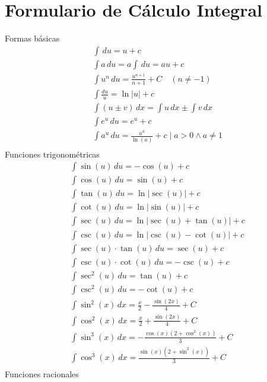 \section{Formulario de Cálculo Integral}
Formas básicas
\begin{align}
    &\int\,du = u + c\\
    &\int a\,du = a\int\,du = au + c\\
    &\int u^n \, du = \frac{u^{n+1}}{n+1} + C \quad (n \neq -1) \\
    &\int \frac{du}{u} = \ln{\left\lvert u\right\rvert} + c\\
    &\int\left(u \pm v \right)\,dx = \int u\,dx \pm \int v\,dx\\
    &\int e^u\,du = e^u+ c\\
    &\int a^u\,du = \frac{a^u}{\ln{(a)}} + c\mid a > 0\land a\neq 1\\
\end{align}
Funciones trigonométricas
\begin{align}
    &\int\sin{(u)}\,du = -\cos{(u)} + c\\
    &\int \cos{(u)}\,du = \sin{(u)} + c\\
    &\int\tan{(u)}\,du = \ln{\left\lvert \sec{(u)}\right\rvert } + c\\
    &\int \cot{(u)}\,  du = \ln{\left\lvert \sin{(u)}  \right\rvert} + c\\
    &\int \sec{(u)}\,  du = \ln{\left\lvert \sec{(u)} + \tan{(u)} \right\rvert } + c\\
    &\int \csc{(u)}\,  du = \ln{\left\lvert \csc{(u)} - \cot{(u)} \right\rvert } + c\\
    &\int \sec {(u)} \cdot \tan{(u)}\,  du = \sec{(u)} + c\\
    &\int \csc{(u)} \cdot   \cot {(u)}\, du = - \csc{(u)} + c\\
    &\int \sec^2{(u)}\,  du = \tan{(u)} + c\\
    &\int \csc^2{(u)}\,  du = - \cot{(u)} + c\\
    &\int \sin^2(x) \, dx = \frac{x}{2} - \frac{\sin(2x)}{4} + C \\
    &\int \cos^2(x) \, dx = \frac{x}{2} + \frac{\sin(2x)}{4} + C \\
    &\int \sin^3(x) \, dx = -\frac{\cos(x)(2 + \cos^2(x))}{3} + C \\
    &\int \cos^3(x) \, dx = \frac{\sin(x)(2 + \sin^2(x))}{3} + C \\
\end{align}
Funciones racionales
